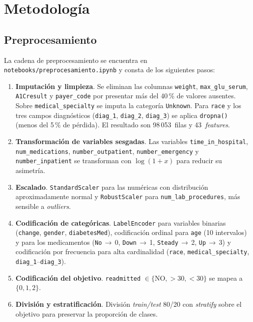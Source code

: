 \documentclass[11pt,a4paper]{article}
\begin{document}
\section{Metodología}
\label{sec:metodologia}

\subsection{Preprocesamiento}

La cadena de preprocesamiento se encuentra en \texttt{notebooks/preprocesamiento.ipynb} y consta de los siguientes pasos:

\begin{enumerate}
    \item \textbf{Imputación y limpieza}. Se eliminan las columnas \texttt{weight}, \texttt{max\_glu\_serum}, \texttt{A1Cresult} y \texttt{payer\_code} por presentar más del 40\,\% de valores ausentes. Sobre \texttt{medical\_specialty} se imputa la categoría \texttt{Unknown}. Para \texttt{race} y los tres campos diagnósticos (\texttt{diag\_1}, \texttt{diag\_2}, \texttt{diag\_3}) se aplica \texttt{dropna()} (menos del 5\,\% de pérdida). El resultado son 98\,053~filas y 43~\textit{features}.
    \item \textbf{Transformación de variables sesgadas}. Las variables \texttt{time\_in\_hospital}, \texttt{num\_medications}, \texttt{number\_outpatient}, \texttt{number\_emergency} y \texttt{number\_inpatient} se transforman con $\log(1+x)$ para reducir su asimetría.
    \item \textbf{Escalado}. \texttt{StandardScaler} para las numéricas con distribución aproximadamente normal y \texttt{RobustScaler} para \texttt{num\_lab\_procedures}, más sensible a \textit{outliers}.
    \item \textbf{Codificación de categóricas}. \texttt{LabelEncoder} para variables binarias (\texttt{change}, \texttt{gender}, \texttt{diabetesMed}), codificación ordinal para \texttt{age} (10 intervalos) y para los medicamentos (\texttt{No}\,$\to$\,0, \texttt{Down}\,$\to$\,1, \texttt{Steady}\,$\to$\,2, \texttt{Up}\,$\to$\,3) y codificación por frecuencia para alta cardinalidad (\texttt{race}, \texttt{medical\_specialty}, \texttt{diag\_1}--\texttt{diag\_3}).
    \item \textbf{Codificación del objetivo}. \texttt{readmitted} $\in\{\text{NO}, >\!30, <\!30\}$ se mapea a $\{0,1,2\}$.
    \item \textbf{División y estratificación}. División \textit{train/test} 80/20 con \textit{stratify} sobre el objetivo para preservar la proporción de clases.
\end{enumerate}
\end{document}

